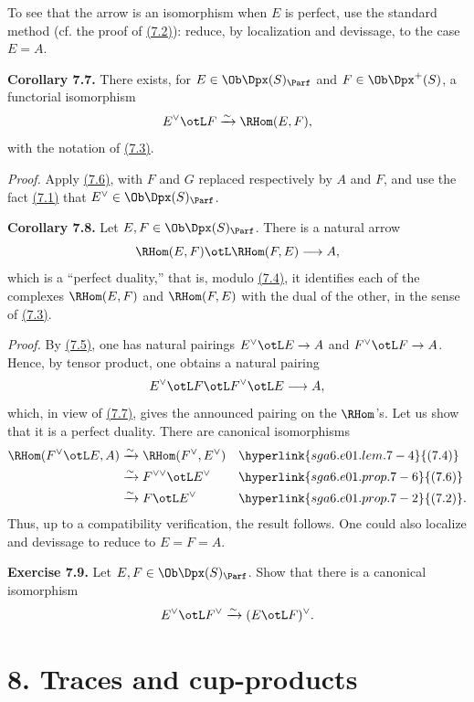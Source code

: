 To see that the arrow is an isomorphism when \(E\) is perfect, use the standard method (cf. the proof of \hyperlink{sga6.e01.prop.7-2}{(7.2)}): reduce, by localization and devissage, to the case \(E=A\).

\textbf{Corollary 7.7.} There exists, for \(E\in\Ob\Dpx(S)_{\Parf}\) and \(F\in\Ob\Dpx^+(S)\), a functorial isomorphism
\[
  E^\vee\otL F\xrightarrow{\sim}\RHom(E,F),
\]
with the notation of \hyperlink{sga6.e01.def.7-3}{(7.3)}.

\emph{Proof.} Apply \hyperlink{sga6.e01.prop.7-6}{(7.6)}, with \(F\) and \(G\) replaced respectively by \(A\) and \(F\), and use the fact \hyperlink{sga6.e01.prop.7-1}{(7.1)} that \(E^\vee\in\Ob\Dpx(S)_{\Parf}\).

\textbf{Corollary 7.8.} Let \(E,F\in\Ob\Dpx(S)_{\Parf}\). There is a natural arrow
\[
  \RHom(E,F)\otL \RHom(F,E)\longrightarrow A,
\]
which is a ``perfect duality,'' that is, modulo \hyperlink{sga6.e01.lem.7-4}{(7.4)}, it identifies each of the complexes \(\RHom(E,F)\) and \(\RHom(F,E)\) with the dual of the other, in the sense of \hyperlink{sga6.e01.def.7-3}{(7.3)}.

\emph{Proof.} By \hyperlink{sga6.e01.lem.7-5}{(7.5)}, one has natural pairings \(E^\vee\otL E\to A\) and \(F^\vee\otL F\to A\). Hence, by tensor product, one obtains a natural pairing
\[
  E^\vee\otL F\otL F^\vee\otL E\longrightarrow A,
\]
which, in view of \hyperlink{sga6.e01.cor.7-7}{(7.7)}, gives the announced pairing on the \(\RHom\)'s. Let us show that it is a perfect duality. There are canonical isomorphisms
\[
\begin{aligned}
\RHom(F^\vee\otL E,A)&\xrightarrow{\sim}\RHom(F^\vee,E^\vee) &&\hyperlink{sga6.e01.lem.7-4}{(7.4)}\\
&\xrightarrow{\sim} F^{\vee\vee}\otL E^\vee &&\hyperlink{sga6.e01.prop.7-6}{(7.6)}\\
&\xrightarrow{\sim} F\otL E^\vee &&\hyperlink{sga6.e01.prop.7-2}{(7.2)}.
\end{aligned}
\]
Thus, up to a compatibility verification, the result follows. One could also localize and devissage to reduce to \(E=F=A\).


\textbf{Exercise 7.9.} Let \(E,F\in\Ob\Dpx(S)_{\Parf}\). Show that there is a canonical isomorphism
\[
  E^\vee\otL F^\vee \xrightarrow{\sim} (E\otL F)^\vee .
\]

\section*{8. Traces and cup-products}

